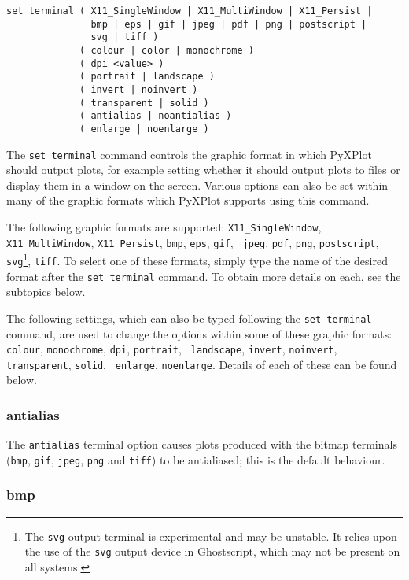 \begin{verbatim}
set terminal ( X11_SingleWindow | X11_MultiWindow | X11_Persist |
               bmp | eps | gif | jpeg | pdf | png | postscript |
               svg | tiff )
             ( colour | color | monochrome )
             ( dpi <value> )
             ( portrait | landscape )
             ( invert | noinvert )
             ( transparent | solid )
             ( antialias | noantialias )
             ( enlarge | noenlarge )
\end{verbatim}

The {\tt set terminal} command controls the graphic format in which PyXPlot
should output plots, for example setting whether it should output plots to files
or display them in a window on the screen. Various options can also be set
within many of the graphic formats which PyXPlot supports using this command.

The following graphic formats are supported:  {\tt X11\_SingleWindow}, {\tt
X11\_MultiWindow}, {\tt X11\_Persist}, {\tt bmp}, {\tt eps}, {\tt gif}, {\tt
jpeg}, {\tt pdf}, {\tt png}, {\tt postscript}, {\tt svg}\footnote{The {\tt svg}
output terminal is experimental and may be unstable. It relies upon the use of
the {\tt svg} output device in Ghostscript, which may not be present on all
systems.}, {\tt tiff}.  To select one of these formats, simply type the name of
the desired format after the {\tt set terminal} command. To obtain more details
on each, see the subtopics below.

The following settings, which can also be typed following the {\tt set
terminal} command, are used to change the options within some of these graphic
formats: {\tt colour}, {\tt monochrome}, {\tt dpi}, {\tt portrait}, {\tt
landscape}, {\tt invert}, {\tt noinvert}, {\tt transparent}, {\tt solid}, {\tt
enlarge}, {\tt noenlarge}. Details of each of these can be found below.


\subsubsection{antialias}

The {\tt antialias} terminal option causes plots produced with the bitmap
terminals ({\tt bmp}, {\tt gif}, {\tt jpeg}, {\tt png} and {\tt tiff}) to be
antialiased; this is the default behaviour.


\subsubsection{bmp}

